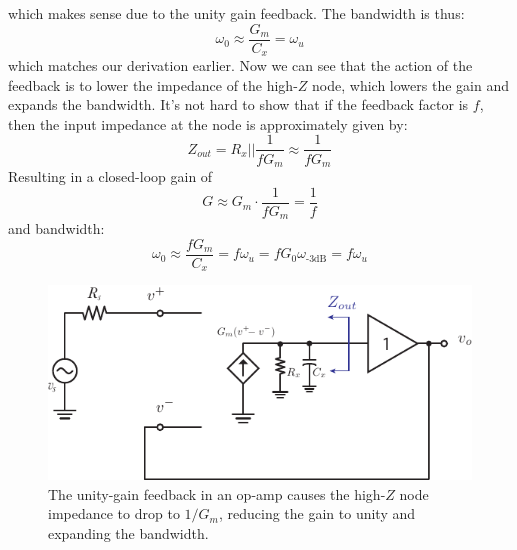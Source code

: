 which makes sense due to the unity gain feedback.  The bandwidth is thus:
    \begin{equation}
        \omega_0 \approx \frac{G_m}{C_x } = \omega_u
    \end{equation}
which matches our derivation earlier.  Now we can see that the action of the feedback is to lower the impedance of the high-$Z$ node, which lowers the gain and expands the bandwidth. It's not hard to show that if the feedback factor is $f$, then the input impedance at the node is approximately given by:
    \begin{equation}
        Z_{out} = R_x || \frac{1}{f G_m} \approx \frac{1}{f G_m}
    \end{equation}
Resulting in a closed-loop gain of 
    \begin{equation}
        G \approx G_m \cdot \frac{1}{f G_m} = \frac{1}{f}
    \end{equation}
and bandwidth:
    \begin{equation}
        \omega_0 \approx \frac{f G_m}{C_x } = f \omega_u  = f G_0 \omega_{\text{-3dB}} = f \omega_u  
    \end{equation}
\begin{figure}[tb]
\centering
\includegraphics[scale=1]{opamp_model_fb_unity_label}
\caption{The unity-gain feedback in an op-amp causes the high-$Z$ node impedance to drop to $1/G_m$, reducing the gain to unity and expanding the bandwidth.}
\label{fig:opamp_model_fb_unity_label}
\end{figure}
